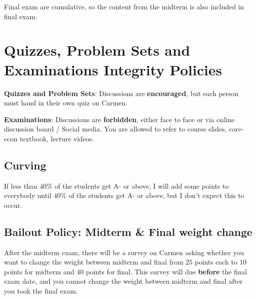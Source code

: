 \documentclass[12pt]{article}
\begin{document}
Final exam are cumulative, so the content from the midterm is also included in final exam.

\section*{Quizzes, Problem Sets and Examinations Integrity Policies}

\textbf{Quizzes and Problem Sets}: Discussions are \textbf{encouraged}, but each person must hand in their own quiz on Carmen.

\textbf{Examinations}: Discussions are \textbf{forbidden}, either face to face or via online discussion board / Social media. You are allowed to refer to course slides, core-econ textbook, lecture videos.



\subsection*{Curving}

If less than $40\%$ of the students get A- or above, I will add some points to everybody until $40\%$ of the students get A- or above, but I don’t expect this to occur.

\subsection*{Bailout Policy: Midterm \& Final weight change}
\label{sub:Bailout_Policy__Midterm____Final_weight_change}

After the midterm exam, there will be a survey on Carmen asking whether you want to change the weight between midterm and final from $ 25 $ points each to $ 10 $ points for midterm and $ 40  $ points for final.
This survey will due \textbf{before} the final exam date, and you cannot change the weight between midterm and final after you took the final exam.


\newpage

\end{document}
